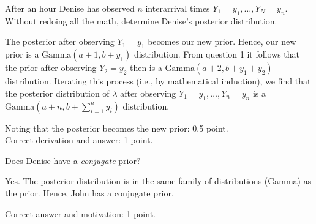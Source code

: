 \begin{exercise}[1.5]
After an hour Denise has observed $n$ interarrival times $Y_1 = y_1, \ldots, Y_N = y_n$. Without redoing all the math, determine Denise's posterior distribution.
\begin{solution}
The posterior after observing $Y_1 = y_1$ becomes our new prior. Hence, our new prior is a $\text{Gamma}(a+1,b+y_1)$ distribution. From question 1 it follows that the prior after observing $Y_2 = y_2$ then is a $\text{Gamma}(a+2,b+y_1 + y_2)$ distribution. Iterating this process (i.e., by mathematical induction), we find that the posterior distribution of $\lambda$ after observing $Y_1 = y_1, \ldots, Y_n = y_n$ is a $\text{Gamma}(a+n,b+ \sum_{i=1}^n y_i)$ distribution.

Noting that the posterior becomes the new prior: 0.5 point.\\
Correct derivation and answer: 1 point.
\end{solution}
\end{exercise}

\begin{exercise}[1]
Does Denise have a \textit{conjugate} prior?
\begin{solution}
Yes. The posterior distribution is in the same family of distributions  (Gamma) as the prior. Hence, John has a conjugate prior.

Correct answer and motivation: 1 point.
\end{solution}
\end{exercise}